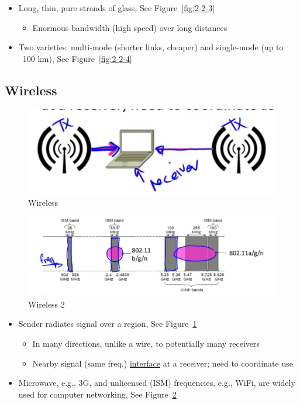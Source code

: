 \documentclass[12pt]{ctexart}   %
\begin{document}
	\begin{itemize}
		\item Long, thin, pure strands of glass, See Figure~\ref{fig:2-2-3}
		\begin{itemize}
			\item Enormous bandwidth (high speed) over long distances
		\end{itemize}
		
		\item Two varieties: multi-mode (shorter links, cheaper) and single-mode (up to ~100 km), See Figure~\ref{fig:2-2-4}
	\end{itemize}
	
	\subsection{Wireless}
	
	\begin{figure}[h!] %
	 \centering
	 \includegraphics[scale=0.7]{images/2-2-5}
	\caption{ Wireless}
	 \label{fig:2-2-5}
	 \end{figure}
	 
	 \begin{figure}[h!] %
	 \centering
	 \includegraphics[scale=0.7]{images/2-2-6}
	\caption{ Wireless 2}
	 \label{fig:2-2-6}
	 \end{figure}
	 
	 \begin{itemize}
	 	\item	Sender radiates signal over a region, See Figure~\ref{fig:2-2-5}
	 	\begin{itemize}
	 		\item In many directions, unlike a wire, to potentially many receivers
	 		\item Nearby signal (same freq.) \underline{interface} at a receiver; need to coordinate use
	 	\end{itemize}
	 	
	 	\item Microwave, e.g., 3G, and unlicensed (ISM) frequencies, e.g., WiFi, are widely used for computer networking, See Figure~\ref{fig:2-2-6}
	 \end{itemize}
\end{document}
